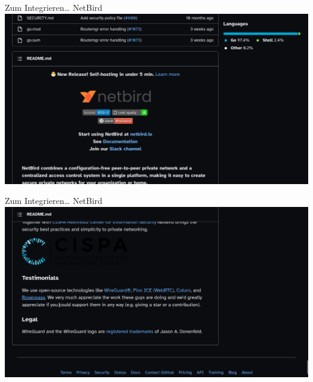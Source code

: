 \documentclass{rosenpass-beamer}
\begin{document}
\begin{frame}{Zum Integrieren… NetBird}
  \includegraphics[height=.9\textheight]{assets/2023-09-02-netbird-gh.png}
\end{frame}

\begin{frame}{Zum Integrieren… NetBird}
  \includegraphics[height=.9\textheight]{assets/2023-09-02-netbird-gh-rosenpass-testemonial.png}
\end{frame}
\end{document}
